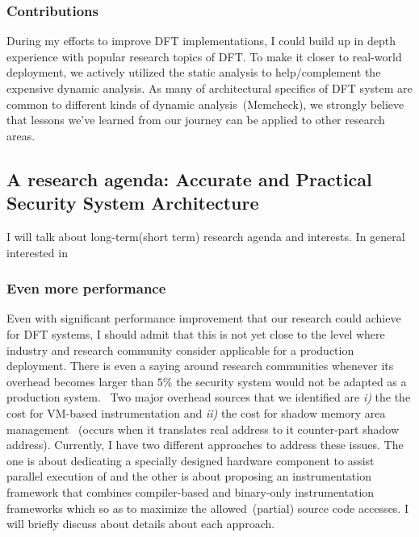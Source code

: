 \documentclass[letterpaper, 10pt]{article}
\begin{document}
\begin{small}
\subsubsection*{Contributions}
During my efforts to improve DFT implementations, I could build up in depth
experience with popular research topics of DFT. 
%
To make it closer to real-world deployment, we actively utilized the static
analysis to help/complement the expensive dynamic analysis. 
%
As many of architectural specifics of DFT system are common to different kinds
of dynamic analysis~(\ie Memcheck), we strongly believe that lessons we've
learned from our journey can be applied to other research areas.
 
\subsection*{A research agenda: Accurate and Practical Security System
Architecture}
I will talk about long-term(short term) research agenda and interests.
%
In general interested in 
\subsubsection*{Even more performance}
Even with significant performance improvement that our research could achieve
for DFT systems, I should admit that this is not yet close to the level where
industry and research community  consider applicable for a production
deployment.
%
There is even a saying around research communities whenever its overhead
becomes larger than $5\%$ the security system would not be adapted as a
production system.~\cite{ccs2013:invited_talk}
%
Two major overhead sources that we identified are {\it i)} the the cost for
VM-based instrumentation and {\it ii)} the cost for shadow memory area
management ~(occurs when it translates real address to it counter-part shadow
address).
%
Currently, I have two different approaches to address these issues. The one is
about dedicating a specially designed hardware component to assist parallel
execution of \SR and the other is about proposing an instrumentation framework
that combines compiler-based and binary-only instrumentation frameworks which
so as to maximize the allowed~(partial) source code accesses.
%
I will briefly discuss about details about each approach.


\end{small}
\end{document}
